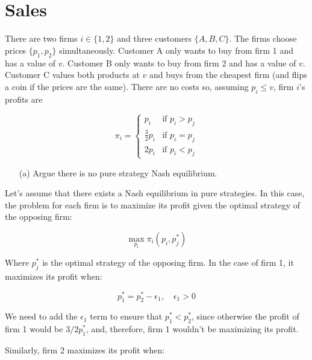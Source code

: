 \section{Sales}

There are two firms $i \in \{1,2\}$ and three customers $\{A, B, C\}$. The firms choose prices $\{p_1,p_2\}$ simultaneously. Customer A only wants to buy from firm 1 and has a value of $v$. Customer B only wants to buy from firm 2 and has a value of $v$. Customer C values both products at $v$ and buys from the cheapest firm (and flips a coin if the prices are the same). There are no costs so, assuming $p_i \leq v$, firm $i$'s profits are

\[
\pi_i = 
\begin{cases} 
p_i & \text{if } p_i > p_j \\
\frac{3}{2}p_i & \text{if } p_i = p_j \\
2p_i & \text{if } p_i < p_j 
\end{cases}
\]


\begin{tcolorbox}
    \begin{enumerate}
        \item[(a)] Argue there is no pure strategy Nash equilibrium.
    \end{enumerate}
\end{tcolorbox}

Let's assume that there exists a Nash equilibrium in pure strategies. In this case, the problem for each firm is to maximize its profit given the optimal strategy of the opposing firm:

\begin{equation*}
    \max_{p_i} \pi_i(p_i, p_j^*)
\end{equation*}

Where $p_j^*$ is the optimal strategy of the opposing firm. In the case of firm 1, it maximizes its profit when:

\begin{equation*}
    p_1^* = p_2^* - \epsilon_1, \quad \epsilon_1 > 0
\end{equation*}

We need to add the $\epsilon_1$ term to ensure that $p_1^* < p_2^*$, since otherwise the profit of firm 1 would be $3/2 p_1^*$, and, therefore, firm 1 wouldn't be maximizing its profit.

Similarly, firm 2 maximizes its profit when:

